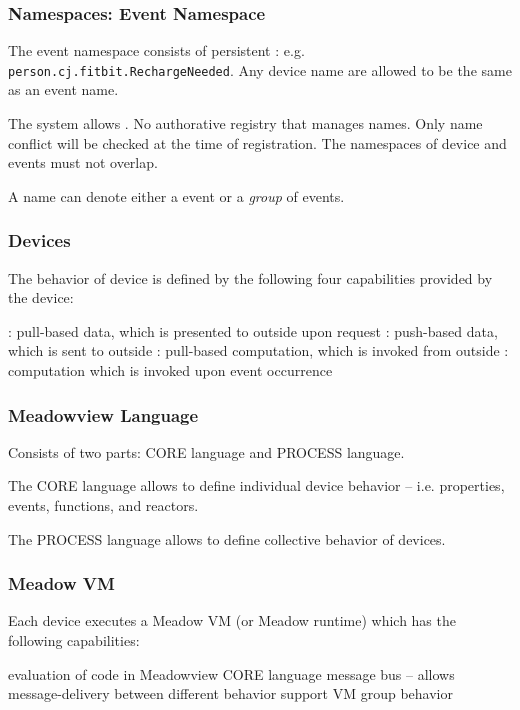 \documentclass{beamer}
\begin{document}
\begin{frame}[fragile]
\frametitle{Namespaces: Event Namespace}

The event namespace consists of persistent : e.g.
\verb+person.cj.fitbit.RechargeNeeded+. 
Any device name are allowed to be the same as an event name.


\vspace*{0.5cm}

The system allows .
   \bit
   \w No authorative registry that manages names. 
   \w Only name conflict will be checked at the time of registration.
   \w The namespaces of device and events must not overlap.
   \eit

\vspace*{0.4cm}

A name can denote either a event or a {\em group\/} of events.

\end{frame}


\begin{frame}[fragile]
\frametitle{Devices}

The behavior of device is defined by the following four capabilities
provided by the device:

\vspace*{0.5cm}

\bit
\w {}: pull-based data, which is presented to outside
upon request 
\w {}: push-based data, which is sent to outside
\w {}: pull-based computation, which is invoked from outside
\w {}: computation which is invoked upon event occurrence
\eit

\end{frame}

\begin{frame}[fragile]
\frametitle{Meadowview Language}
Consists of two parts: CORE language and PROCESS language.

\vspace*{0.5cm}

The CORE language allows to define individual device behavior --
i.e. properties, events, functions, and reactors.

\vspace*{0.5cm}

The PROCESS language allows to define collective behavior of devices.

\end{frame}

\begin{frame}[fragile]
\frametitle{Meadow VM}
Each device executes a Meadow VM (or Meadow runtime) which has the 
following capabilities:

\vspace*{0.5cm}
\bit
\w evaluation of code in Meadowview CORE language
\w message bus -- allows message-delivery between different behavior
\w support VM group behavior
\eit

\end{frame}
\end{document}

